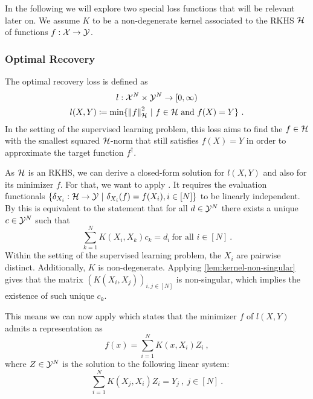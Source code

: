 In the following we will explore two special loss functions that will be relevant later on.
We assume $K$ to be a non-degenerate kernel associated to the RKHS $\mathcal{H}$ of functions $f: \mathcal{X} \rightarrow \mathcal{Y}$.

\subsubsection{Optimal Recovery}
\label{sec:optimal-recovery}

The optimal recovery loss is defined as
\begin{gather}
\label{eq:optimal-recovery-loss}
	l: \mathcal{X}^N \times \mathcal{Y}^N \rightarrow [0, \infty)\\
	l(X, Y) \coloneqq \min\{\norm{f}_{\mathcal{H}}^2 ~|~ f\in \mathcal{H} \text{~and~} f(X) = Y\} \ .
\end{gather}
In the setting of the supervised learning problem, this loss aims to find the $f \in \mathcal{H}$ with the smallest squared $\mathcal{H}$-norm that still satisfies $f(X) = Y$ in order to approximate the target function $f^\dagger$.

As $\mathcal{H}$ is an RKHS, we can derive a closed-form solution for $l(X, Y)$ and also for its minimizer $f$.
For that, we want to apply \cite[Theorem 3.1]{micchelli05}.
It requires the evaluation functionals $\{\delta_{X_i}: \cH \rightarrow \cY \ |\ \delta_{X_i}(f) = f(X_i), i \in [N]\}$ to be linearly independent.
By \cite[Lemma 3.1]{micchelli05} this is equivalent to the statement that for all $d \in \mathcal{Y}^N$ there exists a unique $c \in \mathcal{Y}^N$ such that
\begin{equation}
	\sum_{k=1}^N K(X_i, X_k) c_k = d_i \  \text{for all~} i \in [N] \ .
\end{equation}
Within the setting of the supervised learning problem, the $X_i$ are pairwise distinct.
Additionally, $K$ is non-degenerate.
Applying \cref{lem:kernel-non-singular} gives that the matrix $(K(X_i, X_j))_{i, j \in [N]}$ is non-singular, which implies the existence of such unique $c_k$.

This means we can now apply \cite[Theorem 3.1]{micchelli05} which states that the minimizer $f$ of $l(X, Y)$ admits a representation as 
\begin{equation}
	\label{eq:optimal-recovery-f}
	f(x) = \sum_{i=1}^N K(x, X_i) Z_i \ ,
\end{equation}
where $Z \in \mathcal{Y}^N$ is the solution to the following linear system:
\begin{equation}
	\sum_{i=1}^{N} K(X_j, X_i) Z_i = Y_j \ ,\ j \in [N] \ .
\end{equation}

